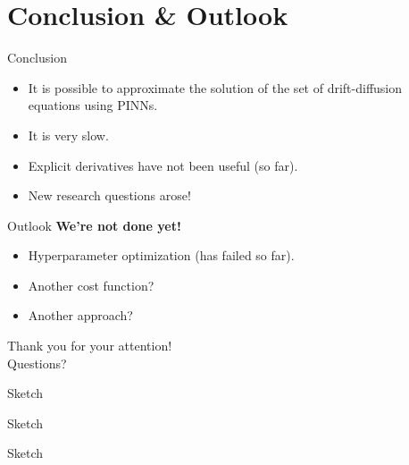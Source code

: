 \documentclass[9pt]{beamer}
\begin{document}
\section{Conclusion \& Outlook}



\begin{frame}{Conclusion}
    \begin{itemize}
        \item It is possible to approximate the solution of the set of drift-diffusion equations using PINNs.
        \item It is very slow.
        \item Explicit derivatives have not been useful (so far).
        \item New research questions arose!
    \end{itemize}
\end{frame}

\begin{frame}{Outlook}
    \textbf{We're not done yet!}
    \begin{itemize}
        \item Hyperparameter optimization (has failed so far). 
        \item Another cost function?
        \item Another approach?
    \end{itemize}
\end{frame}

\begin{frame}
    \begin{center}
        \Huge{Thank you for your attention!} \\
        \huge{Questions?}
    \end{center}
\end{frame}



\begin{frame}{Sketch}
    
\end{frame}

\begin{frame}{Sketch}
    
\end{frame}

\begin{frame}{Sketch}
    
\end{frame}
\end{document}
